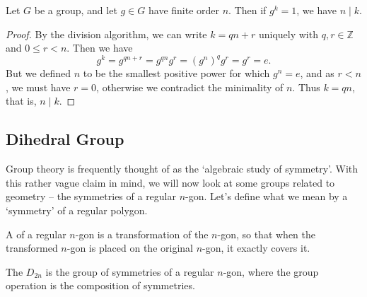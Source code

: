 \documentclass[a4paper]{scrartcl}
\begin{document}
\begin{theorem}
	Let $G$ be a group, and let $g \in G$ have finite order $n$. Then if $g^k = 1$, we have $n \mid k$.
\end{theorem}
\begin{proof}
	By the division algorithm, we can write $k = qn + r$ uniquely with $q, r \in \mathbb{Z}$ and $0 \leq r < n$. Then we have
	$$
	g^{k} = g^{qn + r} = g^{qn} g^r = (g^n)^q g^r = g^r = e.
	$$
	But we defined $n$ to be the smallest positive power for which $g^n = e$, and as $r < n$, we must have $r = 0$, otherwise we contradict the minimality of $n$. Thus $k = qn$, that is, $n \mid k$.
\end{proof}

\subsection{Dihedral Group}

Group theory is frequently thought of as the `algebraic study of symmetry'. With this rather vague claim in mind, we will now look at some groups related to geometry -- the symmetries of a regular $n$-gon. Let's define what we mean by a `symmetry' of a regular polygon.

\begin{definition}
	A  of a regular $n$-gon is a transformation of the $n$-gon, so that when the transformed $n$-gon is placed on the original $n$-gon, it exactly covers it.
\end{definition}

\begin{definition}
	The  $D_{2n}$ is the group of symmetries of a regular $n$-gon, where the group operation is the composition of symmetries.
\end{definition}
\end{document}
